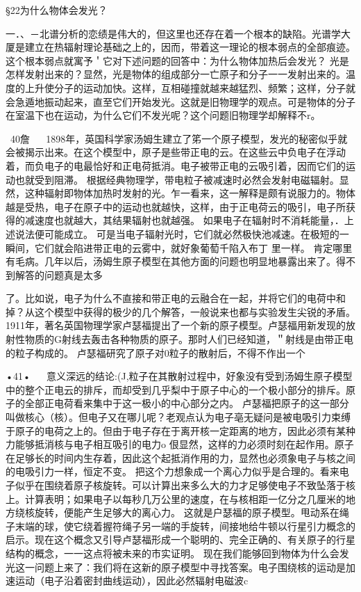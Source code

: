 §22为什么物体会发光？

一．、－北谱分析的恋绩是伟大的，但这里也还存在着一个根本的缺陷。光谱学大厦是建立在热辐射理论基础之上的，因而，带着这一理论的根本弱点的全部痕迹。这个根本弱点就寓予＇它对下述问题的回答中：为什么物体加热后会发光？
光是怎样发射出来的？显然，光是物体的组成部分一亡原子和分子一一发射出来的。温度的上升使分子的运动加快。这样，互相碰撞就越来越猛烈、频繁；这样，分子就会急遁地振动起来，直至它们开始发光。这就是旧物理学的观点。可是物体的分子在室温下也在运动，为什么它们不发光呢？这个问题旧物理学却解释不r。

~40詹
  
1898年，英国科学家汤姆生建立了笫一个原子模型，发光的秘密似乎就会被揭示出来。在这个模型中，原子是些带正电的云。在这些云中负电子在浮动着，而负电子的电最恰好和正电荷抵消。电子被带正电的云吸引着，因而它们的运动也就受到阻滞。
根据经典物理学，带电粒子被减速时必然会发射电磁辐射。显然，这种辐射即物体加热时发射的光。乍一看来，这一解释是颇有说服力的。物体越是受热，电子在原子中的运动也就越快，这样，由于正电荷云的吸引，电子所获得的减速度也就越大，其结果辐射也就越强。
如果电子在辐射时不消耗能量，．上述说法便可能成立。
可是当电子辐射光时，它们就必然极快池减速。在极短的一瞬间，它们就会陷进带正电的云雾中，就好象葡萄千陷入布丁
里一样。
肯定哪里有毛病。几年以后，汤姆生原子模型在其他方面的问题也明显地暴露出来了。得不到解答的问题真是太多

了。比如说，电子为什么不直接和带正电的云融合在一起，并将它们的电荷中和掉？从这个模型中获得的极少的几个解答，一般说来也都与实验发生尖锐的矛盾。
1911年，著名英国物理学家卢瑟福提出了一个新的原子模型。卢瑟福用新发现的放射性物质的G射线去轰击各种物质的原子。那时人们已经知道，＂射线是由带正电的粒子构成的。
卢瑟福研究了原子对0粒子的散射后，不得不作出一个

•41•
  
意义深远的结论:(J,粒子在其散射过程中，好象没有受到汤姆生原子模型中的整个正电云的排斥，而却受到几乎梨中于原子中心的一个极小部分的排斥。原子的全部正电荷看来集中于这一极小的中心部分之内。
卢瑟福把原子的这一部分叫做核心（核）。但电子又在哪儿呢？老观点认为电子亳无疑问是被电吸引力束缚于原子的电荷之上的。但由于电子存在于离开核一定距离的地方，因此必须有某种力能够抵消核与电子相互吸引的电力o
佷显然，这样的力必须时刻在起作用。原子在足够长的时间内生存着，因此这个起抵消作用的力，显然也必须象电子与核之间的电吸引力一样，恒定不变。
把这个力想象成一个离心力似乎是合理的。看来电子似乎在围绕着原子核旋转。可以计算出来多么大的力才足够使电子不致坠落于核上。计算表明；如果电子以每秒几万公里的速度，在与核相距一亿分之几厘米的地方绕核旋转，便能产生足够大的离心力。
这就是户瑟福的原子模型。甩动系在绳子末端的球，使它绕着握符绳子另一端的手旋转，间接地给牛顿以行星引力概念的启示。现在这个概念又引导卢瑟福形成一个聪明的、完全正确的、有关原子的行星结构的概念，一一这点将被未来的市实证明。
现在我们能够回到物体为什么会发光这一问题上来了：我们将在这新的原子模型中寻找答案。电子围绕核的运动是加速运动（电子沿着密封曲线运动），因此必然辐射电磁波c


